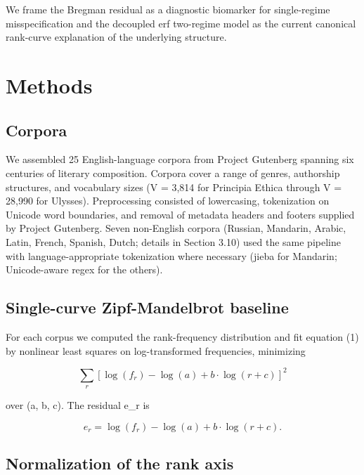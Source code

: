 \documentclass[11pt]{article}
\begin{document}
We frame the Bregman residual as a diagnostic biomarker for single-regime misspecification and the decoupled erf two-regime model as the current canonical rank-curve explanation of the underlying structure.

\section{Methods}\label{sec:methods}

\subsection{Corpora}

We assembled 25 English-language corpora from Project Gutenberg spanning six centuries of literary composition. Corpora cover a range of genres, authorship structures, and vocabulary sizes (V = 3,814 for Principia Ethica through V = 28,990 for Ulysses). Preprocessing consisted of lowercasing, tokenization on Unicode word boundaries, and removal of metadata headers and footers supplied by Project Gutenberg. Seven non-English corpora (Russian, Mandarin, Arabic, Latin, French, Spanish, Dutch; details in Section 3.10) used the same pipeline with language-appropriate tokenization where necessary (jieba for Mandarin; Unicode-aware regex for the others).

\subsection{Single-curve Zipf-Mandelbrot baseline}

For each corpus we computed the rank-frequency distribution and fit equation (1) by nonlinear least squares on log-transformed frequencies, minimizing

\begin{equation}
\tag{2}\label{eq:ols}
\sum_r \left[\log(f_r) - \log(a) + b \cdot \log(r + c)\right]^2
\end{equation}

over (a, b, c). The residual e\_r is

\begin{equation}
\tag{3}\label{eq:residual}
e_r = \log(f_r) - \log(a) + b \cdot \log(r + c).
\end{equation}

\subsection{Normalization of the rank axis}
\end{document}
